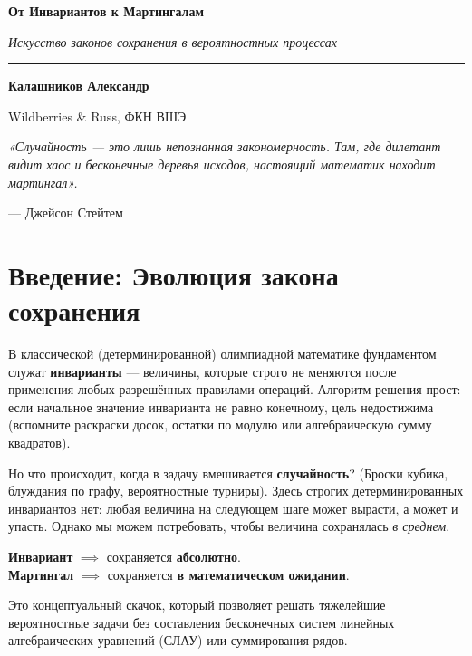 \documentclass[12pt,a4paper]{article}
\begin{document}
\begin{center}
    \vspace*{1.5cm}
    {\Huge \bfseries От Инвариантов к Мартингалам\par}
    \vspace{0.6cm}
    {\Large \itshape Искусство законов сохранения в вероятностных процессах\par}
    \vspace{0.8cm}
    \rule{0.6\textwidth}{1pt}\par
    \vspace{0.8cm}
    {\large \textbf{Калашников Александр}}\par
    \vspace{0.2cm}
    {\small Wildberries \& Russ, ФКН ВШЭ}
    \vspace{1.5cm}
\end{center}

\epigraph{\itshape «Случайность --- это лишь непознанная закономерность. Там, где дилетант видит хаос и бесконечные деревья исходов, настоящий математик находит мартингал».}{--- Джейсон Стейтем}

\tableofcontents
\newpage

\section{Введение: Эволюция закона сохранения}

В классической (детерминированной) олимпиадной математике фундаментом служат \textbf{инварианты} --- величины, которые строго не меняются после применения любых разрешённых правилами операций. 
Алгоритм решения прост: если начальное значение инварианта не равно конечному, цель недостижима (вспомните раскраски досок, остатки по модулю или алгебраическую сумму квадратов).

Но что происходит, когда в задачу вмешивается \textbf{случайность}? (Броски кубика, блуждания по графу, вероятностные турниры). Здесь строгих детерминированных инвариантов нет: любая величина на следующем шаге может вырасти, а может и упасть. Однако мы можем потребовать, чтобы величина сохранялась \textit{в среднем}. 

\begin{center}
    \large
    \textbf{Инвариант} $\implies$ сохраняется \textbf{абсолютно}.\\
    \textbf{Мартингал} $\implies$ сохраняется \textbf{в математическом ожидании}.
\end{center}

Это концептуальный скачок, который позволяет решать тяжелейшие вероятностные задачи без составления бесконечных систем линейных алгебраических уравнений (СЛАУ) или суммирования рядов.
\end{document}
